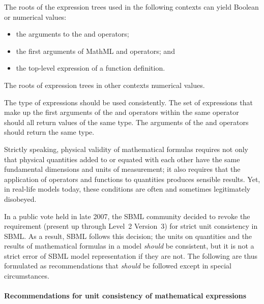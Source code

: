 The roots of the expression trees used in the following contexts can
yield Boolean or numerical values:

\begin{itemize}\setlength{\parskip}{-0.2ex}

\item the arguments to the  and  operators;

\item the first arguments of MathML  and 
operators; and

\item the top-level expression of a function definition.

\end{itemize}

The roots of expression trees in other contexts 
numerical values.

The type of expressions should be used consistently.  The set of
expressions that make up the first arguments of the 
and  operators within the same 
operator should all return values of the same type. The arguments
of the  and  operators should return the same
type.


\label{sec:operator-arg-types}
\label{sec:unit-consistency}

Strictly speaking, physical validity of mathematical formulas
requires not only that physical quantities added to or equated
with each other have the same fundamental dimensions and units of
measurement; it also requires that the application of operators
and functions to quantities produces sensible results.  Yet, in
real-life models today, these conditions are often and sometimes
legitimately disobeyed.

In a public vote held in late 2007, the SBML community decided to
revoke the requirement (present up through Level~2 Version~3) for
strict unit consistency in SBML.  As a result, SBML \thisL follows
this decision; the units on quantities and the results of
mathematical formulas in a model \emph{should} be consistent, but
it is not a strict error of SBML model representation if they are
not.  The following are thus formulated as recommendations that
\emph{should} be followed except in special circumstances.


\paragraph{Recommendations for unit consistency of mathematical expressions}

